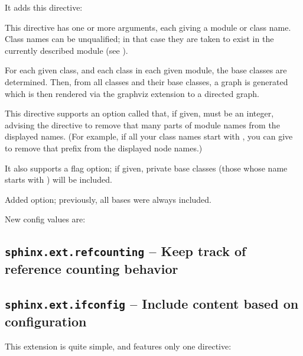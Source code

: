 \documentclass[letterpaper,10pt,english]{sphinxmanual}
\begin{document}
It adds this directive:

\begin{fulllineitems}
\label{ext/inheritance:directive-inheritance-diagram}
This directive has one or more arguments, each giving a module or class
name.  Class names can be unqualified; in that case they are taken to exist
in the currently described module (see {\hyperref[domains:directive\string-py:module]{}}).

For each given class, and each class in each given module, the base classes
are determined.  Then, from all classes and their base classes, a graph is
generated which is then rendered via the graphviz extension to a directed
graph.

This directive supports an option called  that, if given, must be an
integer, advising the directive to remove that many parts of module names
from the displayed names.  (For example, if all your class names start with
, you can give  to remove that prefix from the displayed
node names.)

It also supports a  flag option; if given, private base
classes (those whose name starts with \code{\_}) will be included.

Added  option; previously, all bases were always
included.

\end{fulllineitems}


New config values are:


\subsection{\texttt{sphinx.ext.refcounting} -- Keep track of reference counting behavior}
\label{ext/refcounting::doc}\label{ext/refcounting:module-sphinx.ext.refcounting}\label{ext/refcounting:sphinx-ext-refcounting-keep-track-of-reference-counting-behavior}

\subsection{\texttt{sphinx.ext.ifconfig} -- Include content based on configuration}
\label{ext/ifconfig::doc}\label{ext/ifconfig:sphinx-ext-ifconfig-include-content-based-on-configuration}\label{ext/ifconfig:module-sphinx.ext.ifconfig}
This extension is quite simple, and features only one directive:
\end{document}
